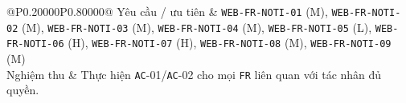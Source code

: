 \begin{longtable}{@{}P{0.20000\SRSWidth}P{0.80000\SRSWidth}@{}}
Yêu cầu /\allowbreak{} ưu tiên & \texttt{WEB-\allowbreak{}FR-\allowbreak{}NOTI-\allowbreak{}01} (M), \texttt{WEB-\allowbreak{}FR-\allowbreak{}NOTI-\allowbreak{}02} (M), \texttt{WEB-\allowbreak{}FR-\allowbreak{}NOTI-\allowbreak{}03} (M), \texttt{WEB-\allowbreak{}FR-\allowbreak{}NOTI-\allowbreak{}04} (M), \texttt{WEB-\allowbreak{}FR-\allowbreak{}NOTI-\allowbreak{}05} (L), \texttt{WEB-\allowbreak{}FR-\allowbreak{}NOTI-\allowbreak{}06} (H), \texttt{WEB-\allowbreak{}FR-\allowbreak{}NOTI-\allowbreak{}07} (H), \texttt{WEB-\allowbreak{}FR-\allowbreak{}NOTI-\allowbreak{}08} (M), \texttt{WEB-\allowbreak{}FR-\allowbreak{}NOTI-\allowbreak{}09} (M) \\[3pt]
Nghiệm thu & Thực hiện \texttt{AC}-01/\allowbreak{}\texttt{AC}-02 cho mọi \texttt{FR} liên quan với tác nhân đủ quyền. \\[3pt]
\end{longtable}
\endgroup

